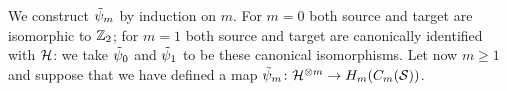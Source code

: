 % 
% 
% 
We construct $\tilde\psi_m$ by induction on $m$. For $m=0$ both source and target are
isomorphic to $\mathbb{Z}_2$; for $m=1$
both source and target are canonically identified with $\mathcal{H}$: we take $\tilde\psi_0$ and $\tilde\psi_1$
to be these canonical isomorphisms.
Let now $m\geq 1$ and suppose that we have defined a map $\tilde\psi_m\colon \mathcal{H}^{\otimes m}\to H_m(C_m(\mathcal{S}))$.

